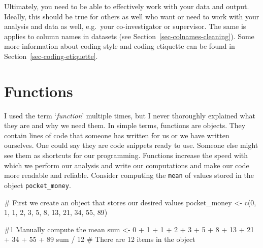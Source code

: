 \documentclass[
  letterpaper,
]{krantz}
\makeatletter
\newenvironment{Shaded}{\begin{snugshade}}{\end{snugshade}}
\newcommand{\CommentTok}[1]{\textcolor[rgb]{0.37,0.37,0.37}{#1}}
\newcommand{\DecValTok}[1]{\textcolor[rgb]{0.68,0.00,0.00}{#1}}
\newcommand{\FunctionTok}[1]{\textcolor[rgb]{0.28,0.35,0.67}{#1}}
\newcommand{\NormalTok}[1]{\textcolor[rgb]{0.00,0.23,0.31}{#1}}
\newcommand{\OtherTok}[1]{\textcolor[rgb]{0.00,0.23,0.31}{#1}}
\newcommand{\SpecialCharTok}[1]{\textcolor[rgb]{0.37,0.37,0.37}{#1}}
\newenvironment{kframe}{%
\medskip{}
\setlength{\fboxsep}{.8em}
 \def\at@end@of@kframe{}%
 \ifinner\ifhmode%
  \def\at@end@of@kframe{\end{minipage}}%
  \begin{minipage}{\columnwidth}%
 \fi\fi%
 \def\FrameCommand##1{\hskip\@totalleftmargin \hskip-\fboxsep
 \colorbox{shadecolor}{##1}\hskip-\fboxsep
     \hskip-\linewidth \hskip-\@totalleftmargin \hskip\columnwidth}%
 \MakeFramed {\advance\hsize-\width
   \@totalleftmargin\z@ \linewidth\hsize
   \@setminipage}}%
 {\par\unskip\endMakeFramed%
 \at@end@of@kframe}
\renewenvironment{Shaded}{\begin{kframe}}{\end{kframe}}
\makeatother
\begin{document}
Ultimately, you need to be able to effectively work with your data and
output. Ideally, this should be true for others as well who want or need
to work with your analysis and data as well, e.g.~your co-investigator
or supervisor. The same is applies to column names in datasets (see
Section~\ref{sec-colnames-cleaning}). Some more information about coding
style and coding etiquette can be found in
Section~\ref{sec-coding-etiquette}.

\section{Functions}\label{sec-functions}

I used the term `\emph{function}' multiple times, but I never thoroughly
explained what they are and why we need them. In simple terms, functions
are objects. They contain lines of code that someone has written for us
or we have written ourselves. One could say they are code snippets ready
to use. Someone else might see them as shortcuts for our programming.
Functions increase the speed with which we perform our analysis and
write our computations and make our code more readable and reliable.
Consider computing the \texttt{mean} of values stored in the object
\texttt{pocket\_money}.

\begin{Shaded}
\begin{Highlighting}[]
\CommentTok{\# First we create an object that stores our desired values}
\NormalTok{pocket\_money }\OtherTok{\textless{}{-}} \FunctionTok{c}\NormalTok{(}\DecValTok{0}\NormalTok{, }\DecValTok{1}\NormalTok{, }\DecValTok{1}\NormalTok{, }\DecValTok{2}\NormalTok{, }\DecValTok{3}\NormalTok{, }\DecValTok{5}\NormalTok{, }\DecValTok{8}\NormalTok{, }\DecValTok{13}\NormalTok{, }\DecValTok{21}\NormalTok{, }\DecValTok{34}\NormalTok{, }\DecValTok{55}\NormalTok{, }\DecValTok{89}\NormalTok{)}

\CommentTok{\#1 Manually compute the mean}
\NormalTok{sum }\OtherTok{\textless{}{-}} \DecValTok{0} \SpecialCharTok{+} \DecValTok{1} \SpecialCharTok{+} \DecValTok{1} \SpecialCharTok{+} \DecValTok{2} \SpecialCharTok{+} \DecValTok{3} \SpecialCharTok{+} \DecValTok{5} \SpecialCharTok{+} \DecValTok{8} \SpecialCharTok{+} \DecValTok{13} \SpecialCharTok{+} \DecValTok{21} \SpecialCharTok{+} \DecValTok{34} \SpecialCharTok{+} \DecValTok{55} \SpecialCharTok{+} \DecValTok{89}
\NormalTok{sum }\SpecialCharTok{/} \DecValTok{12} \CommentTok{\# There are 12 items in the object}
\end{Highlighting}
\end{Shaded}
\end{document}
